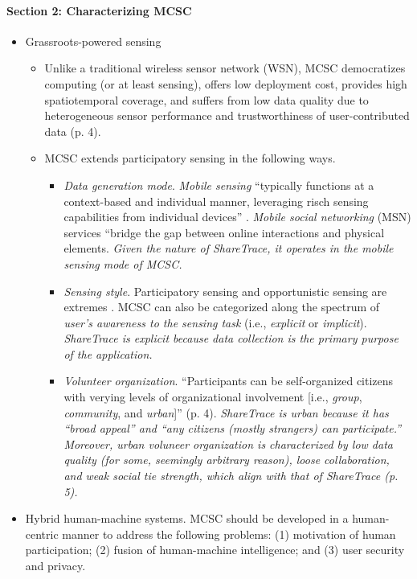 \paragraph{Section 2: Characterizing MCSC}
	\begin{itemize}
	\item Grassroots-powered sensing
		\begin{itemize}
		\item Unlike a traditional wireless sensor network (WSN), MCSC democratizes computing (or at least sensing), offers low deployment cost, provides high spatiotemporal coverage, and suffers from low data quality due to heterogeneous sensor performance and trustworthiness of user-contributed data (p. 4).
		\item MCSC extends participatory sensing in the following ways.
			\begin{itemize}
			\item \emph{Data generation mode}. \emph{Mobile sensing} ``typically functions at a context-based and individual manner, leveraging risch sensing capabilities from individual devices'' \cite{Lane2010}. \emph{Mobile social networking} (MSN) services ``bridge the gap between online interactions and physical elements. \emph{Given the nature of ShareTrace, it operates in the mobile sensing mode of MCSC.}
			\item \emph{Sensing style}. Participatory sensing and opportunistic sensing are extremes \cite{Ganti2011}. MCSC can also be categorized along the spectrum of \emph{user's awareness to the sensing task} (i.e., \emph{explicit} or \emph{implicit}). \emph{ShareTrace is explicit because data collection is the primary purpose of the application.}
			\item \emph{Volunteer organization}. ``Participants can be self-organized citizens with verying levels of organizational involvement [i.e., \emph{group}, \emph{community}, and \emph{urban}]'' (p. 4). \emph{ShareTrace is urban because it has ``broad appeal'' and ``any citizens (mostly strangers) can participate.'' Moreover, urban voluneer organization is characterized by low data quality (for some, seemingly arbitrary reason), loose collaboration, and weak social tie strength, which align with that of ShareTrace (p. 5).}
			\end{itemize}
		\end{itemize}
	\item Hybrid human-machine systems. MCSC should be developed in a human-centric manner to address the following problems: (1) motivation of human participation; (2) fusion of human-machine intelligence; and (3) user security and privacy.

\end{itemize}
